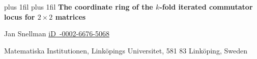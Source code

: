 %
%

\newcommand{\orcidid}[1]{%
  \href{https://orcid.org/#1}{%
    \textcolor{orcidgreen}{\fontsize{8}{9}\selectfont iD}%
    \,\fontsize{8}{9}\selectfont #1}}

\begingroup
\centering
\textwidth plus 1fil \textwidth plus 1fil
    \fontsize{15}{18}\selectfont\bfseries
    The coordinate ring of the $k$-fold iterated commutator locus for
    $2 \times 2$ matrices%
    \par
\endgroup

\begingroup
\centering
\vspace{0.8em}
{\fontsize{11}{13}\selectfont Jan Snellman\hspace{0.25em}%
  \orcidid{0009-0002-6676-5068}\par}

\vspace{0.35em}

{\fontsize{9}{11}\selectfont Matematiska Institutionen, Linköpings
  Universitet, 581 83 Linköping, Sweden\par}

\vspace{0.15em}

